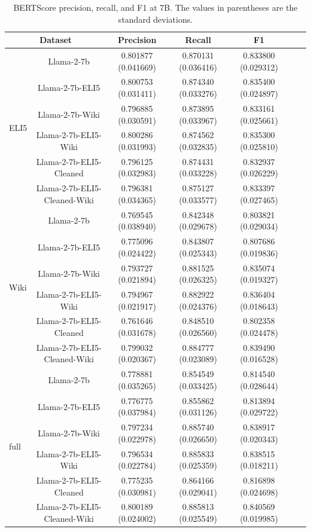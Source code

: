 \documentclass[11pt, oneside]{article}   	%
\begin{document}
\begin{table}[ht]
\centering
\begin{tabular}{lcccccc}
\toprule
\multicolumn{2}{c}{Dataset} & \multicolumn{1}{c}{Precision} & \multicolumn{1}{c}{Recall} & \multicolumn{1}{c}{F1} \\
\midrule
\multirow{6}{*}{ELI5} & Llama-2-7b & 0.801877 (0.041669) & 0.870131 (0.036416) & 0.833800 (0.029312) \\
& Llama-2-7b-ELI5 & 0.800753 (0.031411) & 0.874340 (0.033276) & 0.835400 (0.024897) \\
& Llama-2-7b-Wiki & 0.796885 (0.030591) & 0.873895 (0.033967) & 0.833161 (0.025661) \\
& Llama-2-7b-ELI5-Wiki & 0.800286 (0.031993) & 0.874562 (0.032835) & 0.835300 (0.025810) \\
& Llama-2-7b-ELI5-Cleaned & 0.796125 (0.032983) & 0.874431 (0.033228) & 0.832937 (0.026229) \\
& Llama-2-7b-ELI5-Cleaned-Wiki & 0.796381 (0.034365) & 0.875127 (0.033577) & 0.833397 (0.027465) \\
\midrule
\multirow{6}{*}{Wiki} & Llama-2-7b & 0.769545 (0.038940) & 0.842348 (0.029678) & 0.803821 (0.029034) \\
& Llama-2-7b-ELI5 & 0.775096 (0.024422) & 0.843807 (0.025343) & 0.807686 (0.019836) \\
& Llama-2-7b-Wiki & 0.793727 (0.021894) & 0.881525 (0.026325) & 0.835074 (0.019327) \\
& Llama-2-7b-ELI5-Wiki & 0.794967 (0.021917) & 0.882922 (0.024376) & 0.836404 (0.018643) \\
& Llama-2-7b-ELI5-Cleaned & 0.761646 (0.031678) & 0.848510 (0.026560) & 0.802358 (0.024478) \\
& Llama-2-7b-ELI5-Cleaned-Wiki & 0.799032 (0.020367) & 0.884777 (0.023089) & 0.839490 (0.016528) \\
\midrule
\multirow{6}{*}{full} & Llama-2-7b & 0.778881 (0.035265) & 0.854549 (0.033425) & 0.814540 (0.028644) \\
& Llama-2-7b-ELI5 & 0.776775 (0.037984) & 0.855862 (0.031126) & 0.813894 (0.029722) \\
& Llama-2-7b-Wiki & 0.797234 (0.022978) & 0.885740 (0.026650) & 0.838917 (0.020343) \\
& Llama-2-7b-ELI5-Wiki & 0.796534 (0.022784) & 0.885833 (0.025359) & 0.838515 (0.018211) \\
& Llama-2-7b-ELI5-Cleaned & 0.775235 (0.030981) & 0.864166 (0.029041) & 0.816898 (0.024698) \\
& Llama-2-7b-ELI5-Cleaned-Wiki & 0.800189 (0.024002) & 0.885813 (0.025549) & 0.840569 (0.019985) \\
\bottomrule
\end{tabular}
\caption{BERTScore precision, recall, and F1 at 7B. The values in parentheses are the standard deviations.}
\label{tab:bertscores_7b}
\end{table}
\end{document}

